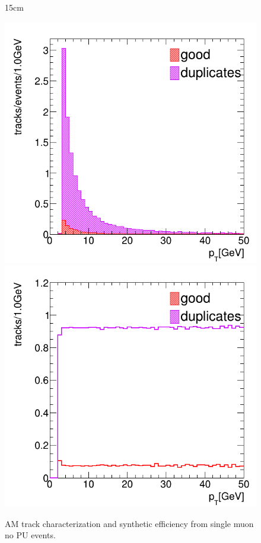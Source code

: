 \begin{figure}[htbp]{15cm}
	\caption{AM track characterization and synthetic efficiency from single muon no PU events.}	
	\centering
	\includegraphics[scale=0.23]{AppendixCMSL1TT/figs/single_muon_nopu_tcat/am_tracks_categorization_vs_pt_allogics_nodupremoval}
	\includegraphics[scale=0.23]{AppendixCMSL1TT/figs/single_muon_nopu_tcat/am_tracks_ratio_vs_pt_allogics_nodupremoval}

\end{figure}
